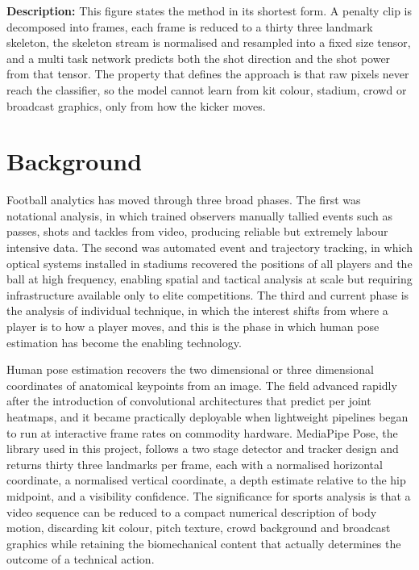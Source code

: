 \noindent
\textbf{Description:} This figure states the method in its shortest form. A penalty clip is decomposed into frames, each frame is reduced to a thirty three landmark skeleton, the skeleton stream is normalised and resampled into a fixed size tensor, and a multi task network predicts both the shot direction and the shot power from that tensor. The property that defines the approach is that raw pixels never reach the classifier, so the model cannot learn from kit colour, stadium, crowd or broadcast graphics, only from how the kicker moves.

\section{Background}

Football analytics has moved through three broad phases. The first was notational analysis, in which trained observers manually tallied events such as passes, shots and tackles from video, producing reliable but extremely labour intensive data. The second was automated event and trajectory tracking, in which optical systems installed in stadiums recovered the positions of all players and the ball at high frequency, enabling spatial and tactical analysis at scale but requiring infrastructure available only to elite competitions. The third and current phase is the analysis of individual technique, in which the interest shifts from where a player is to how a player moves, and this is the phase in which human pose estimation has become the enabling technology.

Human pose estimation recovers the two dimensional or three dimensional coordinates of anatomical keypoints from an image. The field advanced rapidly after the introduction of convolutional architectures that predict per joint heatmaps, and it became practically deployable when lightweight pipelines began to run at interactive frame rates on commodity hardware. MediaPipe Pose, the library used in this project, follows a two stage detector and tracker design and returns thirty three landmarks per frame, each with a normalised horizontal coordinate, a normalised vertical coordinate, a depth estimate relative to the hip midpoint, and a visibility confidence. The significance for sports analysis is that a video sequence can be reduced to a compact numerical description of body motion, discarding kit colour, pitch texture, crowd background and broadcast graphics while retaining the biomechanical content that actually determines the outcome of a technical action.

